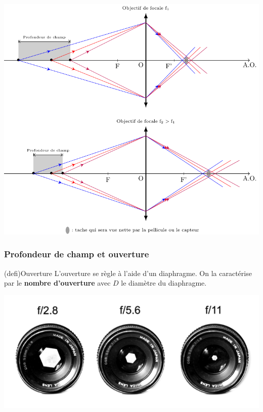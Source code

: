 \documentclass[../../main/main.tex]{subfiles}
\begin{document}
\begin{center}
	\includegraphics[scale=.85]{pfd_chp-foc}
\end{center}


\subsubsection{Profondeur de champ et ouverture}


\begin{tcb*}[sidebyside, righthand ratio=.45](defi){Ouverture}
	L'ouverture se règle à l'aide d'un diaphragme. On la caractérise par le
	\textbf{nombre d'ouverture}
	\psw{%
		\[
			N = \frac{f'}{D}
		\]
	}%
	avec $D$ le diamètre du diaphragme.
	\tcblower
	\begin{center}
		\includegraphics[scale=.8]{ouv_exem}
	\end{center}
\end{tcb*}
\end{document}
